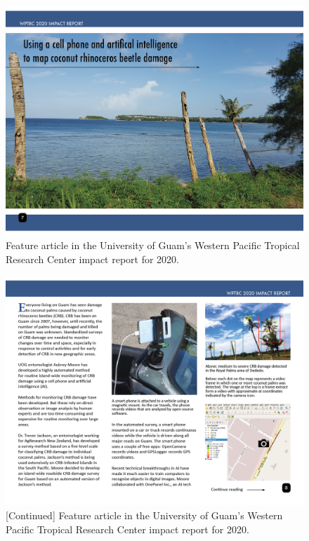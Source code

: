 \documentclass[12pt,letterpaper,english,bibliography=totocnumbered, abstract=on]{scrartcl}
\begin{document}
\begin{figure}[h]
	\centering
	\includegraphics[width=1\linewidth]{images/impact-report07.png}
	\caption{Feature article in the University of Guam's Western Pacific Tropical Research Center impact report for 2020.}
	\label{fig:roadside1-1}
\end{figure}

\begin{figure}[h]
	\centering
	\includegraphics[width=1\linewidth]{images/impact-report08.png}
	\caption{[Continued] Feature article in the University of Guam's Western Pacific Tropical Research Center impact report for 2020.}
	\label{fig:roadside1-2}
\end{figure}
\end{document}
